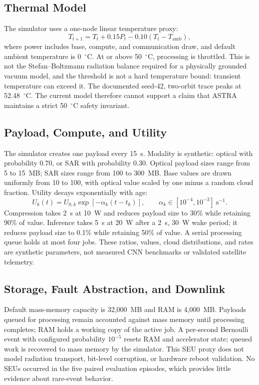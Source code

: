 \documentclass[11pt,letterpaper]{article}
\begin{document}
\subsection{Thermal Model}
The simulator uses a one-node linear temperature proxy:
\begin{equation}
T_{t+1}=T_t+0.15P_t-0.10(T_t-T_{\mathrm{amb}}),
\end{equation}
where power includes base, compute, and communication draw, and default ambient temperature is 0~$^\circ$C. At or above 50~$^\circ$C, processing is throttled. This is not the Stefan--Boltzmann radiation balance required for a physically grounded vacuum model, and the threshold is not a hard temperature bound: transient temperature can exceed it. The documented seed-42, two-orbit trace peaks at 52.48~$^\circ$C. The current model therefore cannot support a claim that ASTRA maintains a strict 50~$^\circ$C safety invariant.

\subsection{Payload, Compute, and Utility}
The simulator creates one payload every 15~s. Modality is synthetic: optical with probability 0.70, or SAR with probability 0.30. Optical payload sizes range from 5 to 15~MB; SAR sizes range from 100 to 300~MB. Base values are drawn uniformly from 10 to 100, with optical value scaled by one minus a random cloud fraction. Utility decays exponentially with age:
\begin{equation}
U_k(t)=U_{0,k}\exp[-\alpha_k(t-t_k)],\qquad
\alpha_k\in[10^{-4},10^{-3}]~\mathrm{s}^{-1}.
\end{equation}
Compression takes 2~s at 10~W and reduces payload size to 30\% while retaining 90\% of value. Inference takes 5~s at 20~W after a 2~s, 30~W wake period; it reduces payload size to 0.1\% while retaining 50\% of value. A serial processing queue holds at most four jobs. These ratios, values, cloud distributions, and rates are synthetic parameters, not measured CNN benchmarks or validated satellite telemetry.

\subsection{Storage, Fault Abstraction, and Downlink}
Default mass-memory capacity is 32,000~MB and RAM is 4,000~MB. Payloads queued for processing remain accounted against mass memory until processing completes; RAM holds a working copy of the active job. A per-second Bernoulli event with configured probability $10^{-5}$ resets RAM and accelerator state; queued work is recovered to mass memory by the simulator. This SEU proxy does not model radiation transport, bit-level corruption, or hardware reboot validation. No SEUs occurred in the five paired evaluation episodes, which provides little evidence about rare-event behavior.
\end{document}
